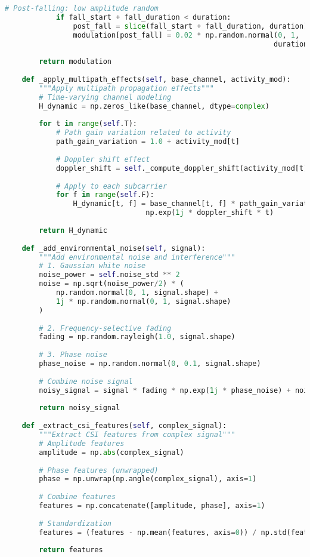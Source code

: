 \begin{lstlisting}[language=Python,caption=Core Implementation of Synthetic Data Generator]
            # Post-falling: low amplitude random
            if fall_start + fall_duration < duration:
                post_fall = slice(fall_start + fall_duration, duration)
                modulation[post_fall] = 0.02 * np.random.normal(0, 1, 
                                                               duration - fall_start - fall_duration)
        
        return modulation
    
    def _apply_multipath_effects(self, base_channel, activity_mod):
        """Apply multipath propagation effects"""
        # Time-varying channel modeling
        H_dynamic = np.zeros_like(base_channel, dtype=complex)
        
        for t in range(self.T):
            # Path gain variation related to activity
            path_gain_variation = 1.0 + activity_mod[t]
            
            # Doppler shift effect
            doppler_shift = self._compute_doppler_shift(activity_mod[t])
            
            # Apply to each subcarrier
            for f in range(self.F):
                H_dynamic[t, f] = base_channel[t, f] * path_gain_variation * \
                                 np.exp(1j * doppler_shift * t)
        
        return H_dynamic
    
    def _add_environmental_noise(self, signal):
        """Add environmental noise and interference"""
        # 1. Gaussian white noise
        noise_power = self.noise_std ** 2
        noise = np.sqrt(noise_power/2) * (
            np.random.normal(0, 1, signal.shape) + 
            1j * np.random.normal(0, 1, signal.shape)
        )
        
        # 2. Frequency-selective fading
        fading = np.random.rayleigh(1.0, signal.shape)
        
        # 3. Phase noise
        phase_noise = np.random.normal(0, 0.1, signal.shape)
        
        # Combine noise signal
        noisy_signal = signal * fading * np.exp(1j * phase_noise) + noise
        
        return noisy_signal
    
    def _extract_csi_features(self, complex_signal):
        """Extract CSI features from complex signal"""
        # Amplitude features
        amplitude = np.abs(complex_signal)
        
        # Phase features (unwrapped)
        phase = np.unwrap(np.angle(complex_signal), axis=1)
        
        # Combine features
        features = np.concatenate([amplitude, phase], axis=1)
        
        # Standardization
        features = (features - np.mean(features, axis=0)) / np.std(features, axis=0)
        
        return features
\end{lstlisting}

